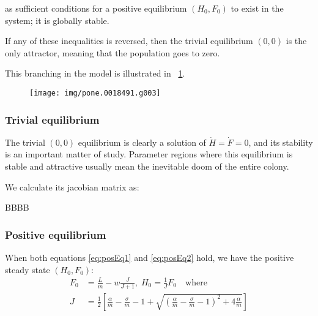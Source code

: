 %
%




as sufficient conditions for a positive equilibrium $(H_0, F_0)$ to exist in the system; it is globally stable.

If any of these inequalities is reversed, then the trivial equilibrium $(0,0)$ is the only attractor, meaning that the population goes to zero.

This branching in the model is illustrated in \figurename~\ref{img:kh11phasePlane}.

\begin{figure}[pbh]
    \centering
    \texttt{[image: img/pone.0018491.g003]}

    \caption[\figurename~3 from \parencite{khoury2011}]{
    }

    \label{img:kh11phasePlane}
\end{figure}

\subsubsection{Trivial equilibrium}
The trivial $(0,0)$ equilibrium is clearly a solution of $\dot{H}=\dot{F}=0$, and its stability is an important matter of study. Parameter regions where this equilibrium is stable and attractive usually mean the inevitable doom of the entire colony.

We calculate its jacobian matrix as:

BBBB

\subsubsection{Positive equilibrium}
When both equations \eqref{eq:posEq1} and \eqref{eq:posEq2} hold, we have the positive steady state $(H_0, F_0)$:
\begin{align}
    F_0 &= \frac{L}{m} -w \frac{J}{J+1}, \; H_0 = \frac{1}{J} F_0 \quad \text{where}
    \label{eq:kh11posEqJSol} \\
    J &= \frac{1}{2} \left[
    \frac{\alpha}{m} - \frac{\sigma}{m} - 1 +
    \sqrt{ {\left( \frac{\alpha}{m} - \frac{\sigma}{m} - 1 \right)}^2
        + 4 \frac{\alpha}{m}
    }
    \right]
    \label{eq:kh11posEqJ}
\end{align}

